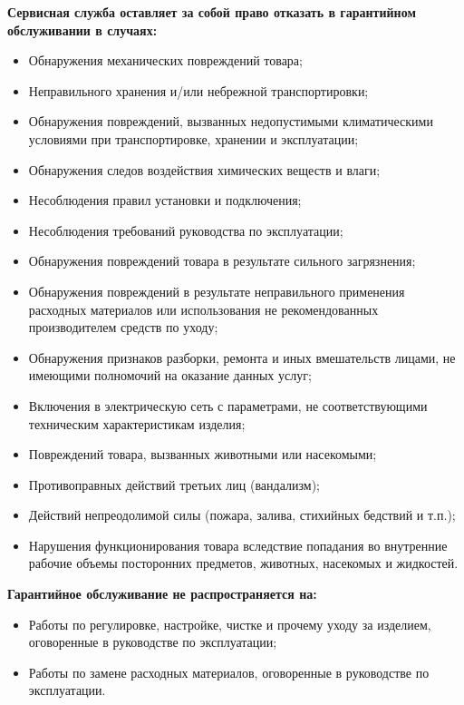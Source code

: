 {    
    \textbf{Сервисная служба оставляет за собой право отказать в гарантийном обслуживании в случаях:}
    \begin{itemize}
    \renewcommand{\labelitemi}{\bf--}
        \item Обнаружения механических повреждений товара;
        \item Неправильного хранения и/или небрежной транспортировки;
        \item Обнаружения повреждений, вызванных недопустимыми климатическими условиями при
    транспортировке, хранении и эксплуатации;
        \item Обнаружения следов воздействия химических веществ и влаги;
        \item Несоблюдения правил установки и подключения;
        \item Несоблюдения требований руководства по эксплуатации;
        \item Обнаружения повреждений товара в результате сильного загрязнения;
        \item Обнаружения повреждений в результате неправильного применения расходных материалов
    или использования не рекомендованных производителем средств по уходу;
        \item Обнаружения признаков разборки, ремонта и иных вмешательств лицами, не имеющими полномочий на оказание данных услуг;
        \item Включения в электрическую сеть с параметрами, не соответствующими техническим характеристикам изделия;
        \item Повреждений товара, вызванных животными или насекомыми;
        \item Противоправных действий третьих лиц (вандализм);
        \item Действий непреодолимой силы (пожара, залива, стихийных бедствий и т.п.);
        \item Нарушения функционирования товара вследствие попадания во внутренние рабочие объемы
    посторонних предметов, животных, насекомых и жидкостей.
    \end{itemize}
    
    \textbf{Гарантийное обслуживание не распространяется на:}
    \begin{itemize}
        \renewcommand{\labelitemi}{\bf--}
        \item Работы по регулировке, настройке, чистке и прочему уходу за изделием, оговоренные в руководстве по эксплуатации;
        \item Работы по замене расходных материалов, оговоренные в руководстве по эксплуатации.    
    \end{itemize}
    
}
